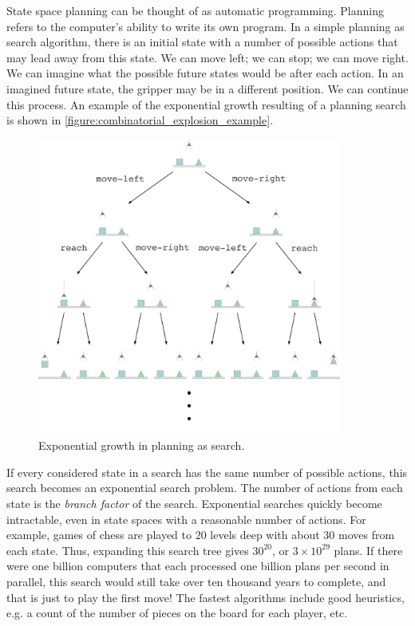 State space planning can be thought of as automatic programming.
Planning refers to the computer's ability to write its own program.
In a simple planning as search algorithm, there is an initial state
with a number of possible actions that may lead away from this state.
We can move left; we can stop; we can move right.  We can imagine what
the possible future states would be after each action.  In an imagined
future state, the gripper may be in a different position.  We can
continue this process.  An example of the exponential growth resulting
of a planning search is shown in
{\mbox{\autoref{figure:combinatorial_explosion_example}}}.
\begin{figure}
\center
\includegraphics[width=10cm]{gfx/combinatorial_explosion_example}
\caption{Exponential growth in planning as search.}
\label{figure:combinatorial_explosion_example}
\end{figure}
If every considered state in a search has the same number of possible
actions, this search becomes an exponential search problem.  The
number of actions from each state is the \emph{branch factor} of the
search.  Exponential searches quickly become intractable, even in
state spaces with a reasonable number of actions.  For example, games
of chess are played to 20 levels deep with about 30 moves from each
state.  Thus, expanding this search tree gives $30^{20}$, or $3 \times
10^{29}$ plans.  If there were one billion computers that each
processed one billion plans per second in parallel, this search would
still take over ten thousand years to complete, and that is just to
play the first move!  The fastest algorithms include good heuristics,
e.g. a count of the number of pieces on the board for each player,
etc.

